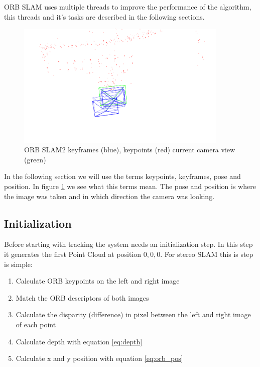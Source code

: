 \documentclass[11pt,a4paper,titlepage,oneside]{report}
\begin{document}
ORB SLAM uses multiple threads to improve the performance of the algorithm, this threads and it's tasks are described in the following sections.

\begin{figure}[H]
  \begin{center}
		\includegraphics[width=0.9\textwidth]{img/pose_map.png}
  \end{center}
	\caption{ORB SLAM2 keyframes (blue), keypoints (red) current camera view (green)}\label{fig:pose_map}
\end{figure}

In the following section we will use the terms keypoints, keyframes, pose and position. In figure \ref{fig:pose_map} we see what this terms mean. The pose and position is where the image was taken and in which direction the camera was looking.

\subsection{Initialization}

Before starting with tracking the system needs an initialization step. In this step it generates the first Point Cloud at position $0,0,0$. For stereo SLAM this is step is simple:
\begin{enumerate}
	\item Calculate ORB keypoints on the left and right image
	\item Match the ORB descriptors of both images
	\item Calculate the disparity (difference) in pixel between the left and right image of each point
	\item Calculate depth with equation \ref{eq:depth}
	\item Calculate x and y position with equation \ref{eq:orb_pos}
\end{enumerate}	
\end{document}

